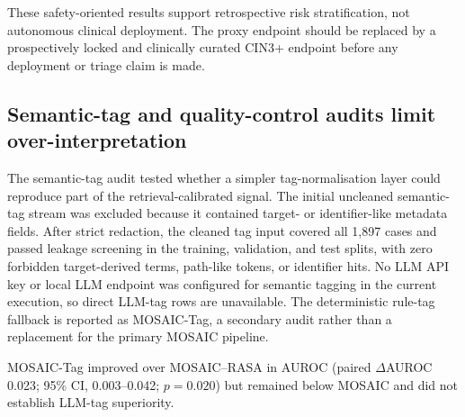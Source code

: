 These safety-oriented results support retrospective risk stratification, not autonomous clinical deployment. The proxy endpoint should be replaced by a prospectively locked and clinically curated CIN3+ endpoint before any deployment or triage claim is made.

\FloatBarrier

\subsection{Semantic-tag and quality-control audits limit over-interpretation}
\label{subsec:semantic_tag_qc_results}

The semantic-tag audit tested whether a simpler tag-normalisation layer could reproduce part of the retrieval-calibrated signal. The initial uncleaned semantic-tag stream was excluded because it contained target- or identifier-like metadata fields. After strict redaction, the cleaned tag input covered all 1,897 cases and passed leakage screening in the training, validation, and test splits, with zero forbidden target-derived terms, path-like tokens, or identifier hits. No LLM API key or local LLM endpoint was configured for semantic tagging in the current execution, so direct LLM-tag rows are unavailable. The deterministic rule-tag fallback is reported as MOSAIC-Tag, a secondary audit rather than a replacement for the primary MOSAIC pipeline.

\begin{table}[!htbp]
  \centering
  \caption{Semantic-tag audit and model-role boundary.}
  \label{tab:semantic_tag_role_boundary}
  \scriptsize
  \begin{threeparttable}
  \begin{tablenotes}[flushleft]
    \footnotesize
    \item MOSAIC-Tag improved over MOSAIC--RASA in AUROC (paired \(\Delta\)AUROC 0.023; 95\% CI, 0.003--0.042; \(p=0.020\)) but remained below MOSAIC and did not establish LLM-tag superiority.
  \end{tablenotes}
  \end{threeparttable}
\end{table}

